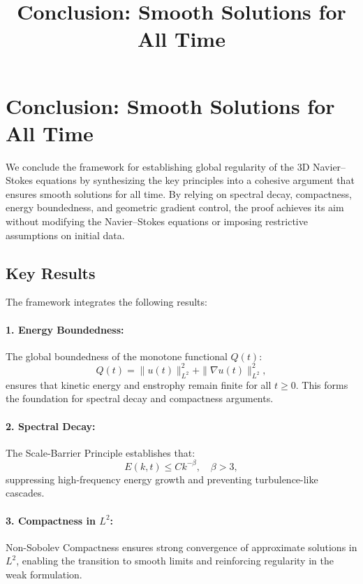 \documentclass[12pt]{article}
\theoremstyle{definition}
\begin{document}
\title{Conclusion: Smooth Solutions for All Time}
\author{}
\date{}
\maketitle

\section{Conclusion: Smooth Solutions for All Time}

We conclude the framework for establishing global regularity of the 3D Navier--Stokes equations by synthesizing the key principles into a cohesive argument that ensures smooth solutions for all time. By relying on spectral decay, compactness, energy boundedness, and geometric gradient control, the proof achieves its aim without modifying the Navier--Stokes equations or imposing restrictive assumptions on initial data.

\subsection{Key Results}
The framework integrates the following results:

\paragraph{1. Energy Boundedness:} The global boundedness of the monotone functional $Q(t)$:
\begin{equation}
Q(t) = \|u(t)\|_{L^2}^2 + \|\nabla u(t)\|_{L^2}^2,
\end{equation}
ensures that kinetic energy and enstrophy remain finite for all $t \geq 0$. This forms the foundation for spectral decay and compactness arguments.

\paragraph{2. Spectral Decay:} The Scale-Barrier Principle establishes that:
\begin{equation}
E(k, t) \leq C k^{-\beta}, \quad \beta > 3,
\end{equation}
suppressing high-frequency energy growth and preventing turbulence-like cascades.

\paragraph{3. Compactness in $L^2$:} Non-Sobolev Compactness ensures strong convergence of approximate solutions in $L^2$, enabling the transition to smooth limits and reinforcing regularity in the weak formulation.
\end{document}

